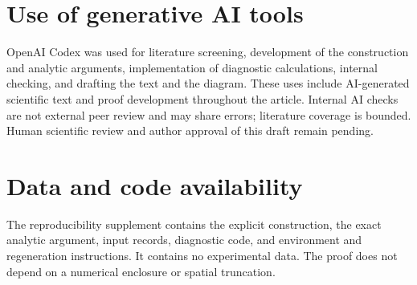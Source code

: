 \documentclass[11pt]{article}
\numberwithin{equation}{section}
\theoremstyle{remark}
\begin{document}
\section*{Use of generative AI tools}

OpenAI Codex was used for literature screening, development of the
construction and analytic arguments, implementation of diagnostic
calculations, internal checking, and drafting the text and the
diagram. These uses include AI-generated scientific text and proof
development throughout the article. Internal AI checks are not
external peer review and may share errors; literature coverage is
bounded. Human scientific review and author approval of this draft
remain pending.

\section*{Data and code availability}

The reproducibility supplement contains the explicit construction,
the exact analytic argument, input records, diagnostic code, and
environment and regeneration instructions. It contains no
experimental data. The proof does not depend on a numerical
enclosure or spatial truncation.



\end{document}
